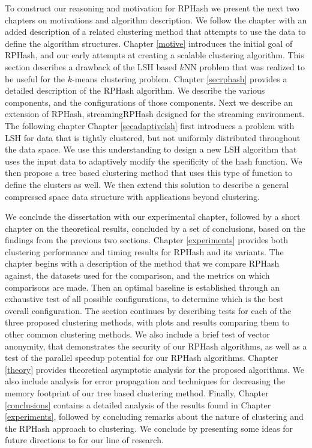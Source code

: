 To construct our reasoning and motivation for \textsf{RPHash} we present the next two chapters on motivations and algorithm description.
We follow the chapter with an added description of a related clustering method that attempts to use the data to define
the algorithm structures.
Chapter \ref{motive} introduces the initial goal of \textsf{RPHash}, and our early attempts at creating a scalable clustering
algorithm.  This section describes a drawback of the LSH based $k$NN problem that was realized to be useful for the
$k$-means clustering problem.
Chapter \ref{secrphash} provides a detailed description of the \textsf{RPHash} algorithm.  We describe the various components,
and the configurations of those components. Next we describe an extension of \textsf{RPHash}, \textsf{streamingRPHash} designed for 
the streaming environment. The following chapter
Chapter \ref{secadaptivelsh} first introduces a problem with LSH for data that is tightly clustered, but not uniformly 
distributed throughout the data space.  We use this understanding to design a new LSH algorithm that uses the input data 
to adaptively modify the specificity of the hash function.  We then propose a tree based clustering method that uses this type
of function to define the clusters as well. We then extend this solution to describe a general compressed space data structure
with applications beyond clustering.  

We conclude the dissertation with our experimental chapter, followed by a short chapter on the theoretical results, 
concluded by a set of conclusions, based on the findings from the previous two sections.
Chapter \ref{experiments} provides both clustering performance and timing results for \textsf{RPHash} and its
variants. The chapter begins with a description of the method that we compare \textsf{RPHash} against, the datasets
used for the comparison, and the metrics on which comparisons are made. Then an optimal baseline is established
through an exhaustive test of all possible configurations, to determine which is the best overall configuration.
The section continues by describing tests for each of the three proposed clustering methods, with plots and results
comparing them to other common clustering methods.  We also include a brief test of vector anonymity,
that demonstrates the security of our \textsf{RPHash} algorithms, as well as a test of the parallel speedup potential for
our \textsf{RPHash} algorithms. Chapter \ref{theory} provides theoretical asymptotic analysis for the proposed  
algorithms. We also include analysis for error propagation and techniques for decreasing the memory footprint of 
our tree based clustering method.  Finally, Chapter \ref{conclusions} contains a detailed analysis of the results
found in Chapter \ref{experiments}, followed by concluding remarks about the nature of clustering and the \textsf{RPHash}
approach to clustering. We conclude by presenting some ideas for future directions to for our line of research. 

